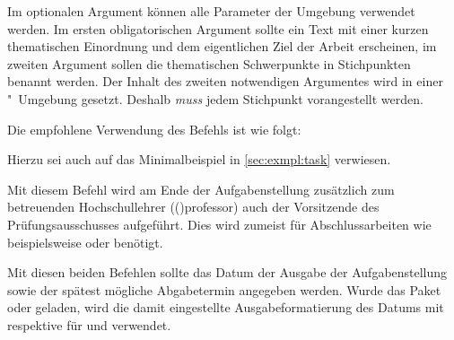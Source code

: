 \begin{DeclareEntity}{}
\begin{Declaration}
Im optionalen Argument können alle Parameter der Umgebung  
verwendet werden. Im ersten obligatorischen Argument sollte ein Text mit einer 
kurzen thematischen Einordnung und dem eigentlichen Ziel der Arbeit erscheinen, 
im zweiten Argument sollen die thematischen Schwerpunkte in Stichpunkten 
benannt werden. Der Inhalt des zweiten notwendigen Argumentes wird in einer 
"~Umgebung gesetzt. Deshalb \emph{muss} jedem Stichpunkt 
 vorangestellt werden.
\end{Declaration}
%
\begin{Example}
Die empfohlene Verwendung des Befehls  ist wie folgt:
\begin{Code}[escapechar=§]
\end{Code}
Hierzu sei auch auf das Minimalbeispiel in \autoref{sec:exmpl:task} verwiesen.%
\end{Example}

\begin{Declaration}
  {}
\printdeclarationlist

Mit diesem Befehl wird am Ende der Aufgabenstellung zusätzlich zum betreuenden 
Hochschullehrer (\Macro(){professor}) auch der Vorsitzende des 
Prüfungsausschusses aufgeführt. Dies wird zumeist für Abschlussarbeiten wie 
beispielsweise \masterthesisname{} oder \diplomathesisname{} benötigt.
\end{Declaration}

\begin{Declaration}
  {}
\begin{Declaration}
  {}
\printdeclarationlist

Mit diesen beiden Befehlen sollte das Datum der Ausgabe der Aufgabenstellung 
sowie der spätest mögliche Abgabetermin angegeben werden. Wurde das Paket 
 oder  geladen, wird die damit eingestellte 
Ausgabeformatierung des Datums mit  respektive  
für  und  verwendet.
\end{Declaration}
\end{Declaration}
%




\end{DeclareEntity}
